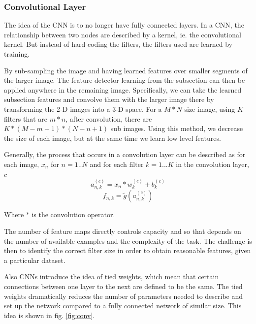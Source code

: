 \documentclass[12pt, twocolumn]{article}
\begin{document}
\subsubsection{Convolutional Layer}
The idea of the CNN is to no longer have fully connected layers. In a CNN, the relationship between two nodes are described by a kernel, ie. the convolutional kernel. But instead of hard coding the filters, the filters used are learned by training. 

By sub-sampling the image and having learned features over smaller segments of the larger image. The feature detector learning from the subsection can then be applied anywhere in the remaining image. Specifically, we can take the learned subsection features and convolve them with the larger image there by transforming the 2-D images into a 3-D space. For a  $M * N $ size image, using $K$ filters that are $m * n$,  after convolution, there are  $ K * (M - m + 1) * (N - n + 1) $ sub images. Using this method, we decrease the size of each image, but at the same time we learn low level features. 


Generally, the process that occurs in a convolution layer can be described as for each image, $x_n$ for $n=1..N$ and for each filter $k=1...K$ in the convolution layer, $c$
\begin{equation}
a_{n,k}^{(c)}= x_n \ast w_k^{(c)} + b_k^{(c)}
\end{equation}
\begin{equation}
f_{n,k}= \tilde{g}(a_{n,k}^{(c)})
\end{equation}
 
 Where $\ast$ is the convolution operator. 
 
 The number of feature maps directly controls capacity and so that depends on the number of available examples and the complexity of the task. The challenge is then to identify the correct filter size in order to obtain reasonable features, given a particular dataset.

Also CNNs introduce the idea of tied weights, which mean that certain connections between one layer to the next are defined to be the same. The tied weights dramatically reduces the number of parameters needed to describe and set up the network compared to a fully connected network of similar size. This idea is shown in fig. \ref{fig:conv}.
\end{document}
